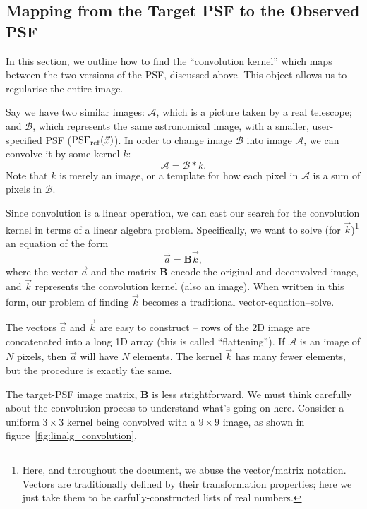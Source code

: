 \documentclass[letterpaper, 11pt]{article}
\def\psfref{\ensuremath{{\rm PSF_{ref}}}\xspace}
\begin{document}
\subsection{Mapping from the Target PSF to the Observed PSF}
\label{sec:kernel}

In this section, we outline how to find the ``convolution kernel'' which maps between the two versions of the PSF, discussed above. This object allows us to regularise the entire image.

Say we have two similar images: $\mathcal{A}$, which is a picture taken by a real telescope; and $\mathcal{B}$, which represents the same astronomical image, with a smaller, user-specified PSF ($\psfref(\vec x)$). In order to change image $\mathcal B$ into image $\mathcal A$, we can convolve it by some kernel $k$:
\begin{equation}
	\mathcal A = \mathcal B \ast k.
\end{equation}
Note that $k$ is merely an image, or a template for how each pixel in $\mathcal A$ is a sum of pixels in $\mathcal B$.

Since convolution is a linear operation, we can cast our search for the convolution kernel in terms of a linear algebra problem. Specifically, we want to solve (for $\vec k$)\footnote{Here, and throughout the document, we abuse the vector/matrix notation. Vectors are traditionally defined by their transformation properties; here we just take them to be carfully-constructed lists of real numbers.} an equation of the form
\begin{equation}\label{eqn:vector}
	\vec a = \mathbf{B} \vec k,
\end{equation}
where the vector $\vec a$ and the matrix $\mathbf{B}$ encode the original and deconvolved image, and $\vec k$ represents the convolution kernel (also an image). When written in this form, our problem of finding $\vec k$ becomes a traditional vector-equation--solve.

The vectors $\vec a$ and $\vec k$ are easy to construct -- rows of the 2D image are concatenated into a long 1D array (this is called ``flattening''). If $\mathcal A$ is an image of $N$ pixels, then $\vec a$ will have $N$ elements. The kernel $\vec k$ has many fewer elements, but the procedure is exactly the same.

The target-PSF image matrix, $\mathbf B$ is less strightforward. We must think carefully about the convolution process to understand what's going on here. Consider a uniform $3\!\times\!3$ kernel being convolved with a $9\!\times\!9$ image, as shown in figure~\ref{fig:linalg_convolution}.
\end{document}
